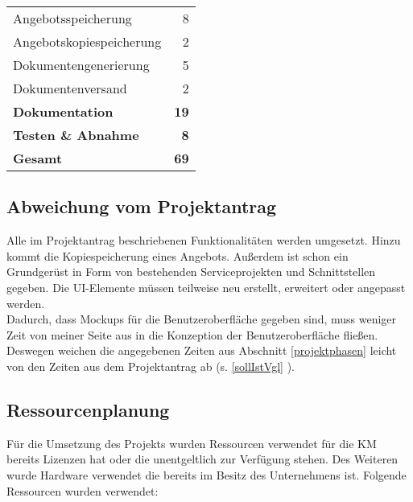 \begin{center}
\begin{tabular}{|l|r|}
		\rowcolor{blue!10}Angebotsspeicherung                                      &                        8 \\
		\rowcolor{blue!10}Angebotskopiespeicherung                                 &                        2 \\
		\rowcolor{blue!10}Dokumentengenerierung                                    &                        5 \\
		\rowcolor{blue!10}Dokumentenversand                                        &                        2 \\
		\rowcolor{blue!50}\textbf{Dokumentation }                                  &             \textbf{ 19} \\
		\rowcolor{blue!50}\textbf{Testen \& Abnahme }                              &              \textbf{ 8} \\ \hline
		\rowcolor{blue!70}\textbf{Gesamt}                                          &             \textbf{ 69} \\ \hline
	\end{tabular}
\end{center}

\subsection{Abweichung vom Projektantrag}
\label{abweichung}
Alle im Projektantrag beschriebenen Funktionalitäten werden umgesetzt. Hinzu kommt die Kopiespeicherung eines Angebots. Außerdem ist schon ein Grundgerüst in Form von bestehenden Serviceprojekten und Schnittstellen gegeben. Die UI-Elemente müssen teilweise neu erstellt, erweitert oder angepasst werden.\\
Dadurch, dass Mockups für die Benutzeroberfläche gegeben sind, muss weniger Zeit von meiner Seite aus in die Konzeption der Benutzeroberfläche fließen. Deswegen weichen die angegebenen Zeiten aus Abschnitt \ref{projektphasen}  leicht von den Zeiten aus dem Projektantrag ab (s. \ref{sollIstVgl} ). 
\subsection{Ressourcenplanung}
\label{ressourcenplanung}
Für die Umsetzung des Projekts wurden Ressourcen verwendet für die \ac{KM} bereits Lizenzen hat oder die unentgeltlich zur Verfügung stehen. Des Weiteren wurde Hardware verwendet die bereits im Besitz des Unternehmens ist.
Folgende Ressourcen wurden verwendet:

